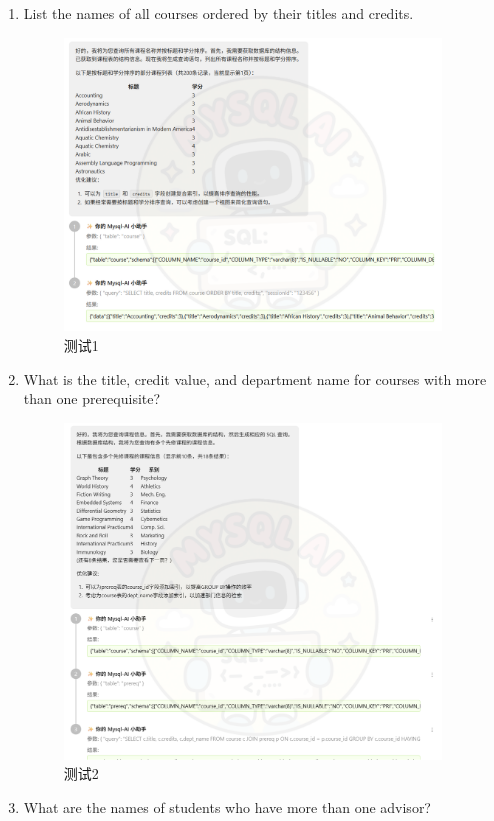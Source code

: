 \documentclass{article}
\begin{document}
	\begin{enumerate}[noitemsep, label={{\arabic*})}]
		\item List the names of all courses ordered by their titles and credits. 
		
		\begin{figure}[H]
			\centering
			\includegraphics[width=10cm]{./images/10.测试1.jpg}
			\caption{测试1}
		\end{figure}
		
		\item What is the title, credit value, and department name for courses with more than one prerequisite?
		
		\begin{figure}[H]
			\centering
			\includegraphics[width=10cm]{./images/11.测试2.jpg}
			\caption{测试2}
		\end{figure}
		
		\item What are the names of students who have more than one advisor?
		

\end{enumerate}
\end{document}
